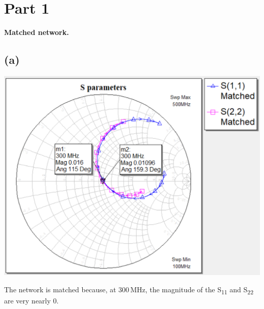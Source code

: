 \documentclass[12pt]{article}
\begin{document}
\pagestyle{fancy}
\fancyhead{}

\section*{Part 1}

\begin{center}
    \textbf{Matched network.}
\end{center}

\subsection*{(a)}

\includegraphics[width=\textwidth]{1 smith chart.png}

The network is matched because, at 300\,\unit{\mega\hertz}, the magnitude of the S\textsubscript{11} and S\textsubscript{22} are very nearly 0.
\end{document}
